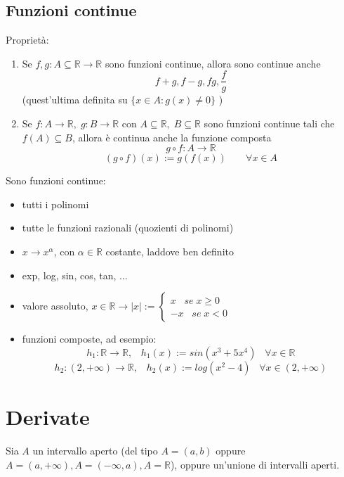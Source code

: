 \documentclass[a4paper]{article}
\theoremstyle{break}
\theoremstyle{break}
\theoremstyle{break}
\theoremstyle{break}
\begin{document}
\subsection{Funzioni continue}

Proprietà:
\begin{enumerate}
  \item Se \( f,g: A \subseteq \mathbb{R} \to  \mathbb{R} \) sono funzioni continue, allora sono continue anche
    \[
      f+g, f-g, fg, \frac{f}{g}
    \]
    (quest'ultima definita su \( \{x \in A: g(x) \neq 0\}  \) )
  \item Se \( f: A \to \mathbb{R},\;g: B \to \mathbb{R} \) con \( A \subseteq \mathbb{R},\; B \subseteq \mathbb{R} \)
    sono funzioni continue tali che \( f(A) \subseteq B \), allora è continua anche la funzione composta
    \[
      g \circ f: A \to \mathbb{R}
    \]
    \[
      (g \circ f)(x) := g(f(x))\;\;\;\;\;\;\; \forall x \in A
    \]
\end{enumerate}
\begin{example}
  Sono funzioni continue:
  \begin{itemize}
    \item tutti i polinomi
    \item tutte le funzioni razionali (quozienti di polinomi)
    \item \( x \to x^\alpha \), con \( \alpha \in \mathbb{R} \) costante, laddove ben definito
    \item exp, log, sin, cos, tan, \( \ldots \)
    \item valore assoluto, \( x \in \mathbb{R} \to |x|:= \begin{cases}
        x\;\;\; se\; x \ge 0 \\
        -x\;\;\; se\; x < 0
      \end{cases} \)
    \item funzioni composte, ad esempio:
      \[
        h_1: \mathbb{R} \to \mathbb{R},\;\;\; h_1(x):=sin(x^3 + 5x^4)\;\;\; \forall x \in \mathbb{R}
      \]
      \[
        h_2:(2, +\infty) \to \mathbb{R}, \;\;\; h_2(x):=log(x^2-4)\;\;\; \forall x \in (2, +\infty)
      \]
  \end{itemize}
\end{example}

\section{Derivate}
Sia \( A \) un intervallo aperto (del tipo \( A=(a,b) \) oppure \( A=(a,+\infty), A=(-\infty, a), A=\mathbb{R} \)),
oppure un'unione di intervalli aperti.
\end{document}
